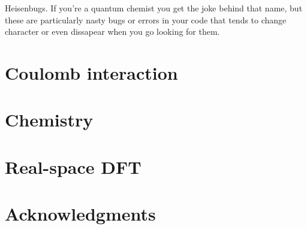 Heisenbugs. If you're a quantum chemist you get the joke behind that name, but these are 
particularly nasty bugs or errors in your code that tends to change character or even dissapear
when you go looking for them.

\section{Coulomb interaction}
\section{Chemistry}
\section{Real-space DFT}
\section{Acknowledgments}

